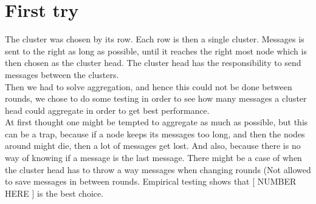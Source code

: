 \documentclass{article}
\begin{document}
  \section{First try}
    The cluster was chosen by its row. Each row is then a single cluster. Messages
    is sent to the right as long as possible, until it reaches the right most
    node which is then chosen as the cluster head. The cluster head has the 
    responsibility to send messages between the clusters.\\
    Then we had to solve aggregation, and hence this could not be done between
    rounds, we chose to do some testing in order to see how many messages a cluster
    head could aggregate in order to get best performance.\\
    At first thought one might be tempted to aggregate as much as possible, but
    this can be a trap, because if a node keeps its messages too long, and then 
    the nodes around might die, then a lot of messages get lost. And also, because
    there is no way of knowing if a message is the last message. There might be 
    a case of when the cluster head has to throw a way messages when changing 
    rounds (Not allowed to save messages in between rounds. Empirical testing 
    shows that [ NUMBER HERE ] is the best choice.
    
    
\end{document}
